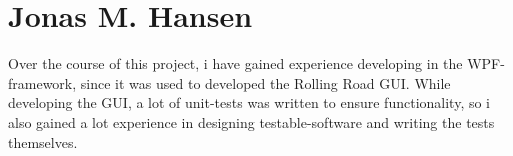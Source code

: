 \section{Jonas M. Hansen}
Over the course of this project, i have gained experience developing in the WPF-framework, since it was used to developed the Rolling Road GUI. While developing the GUI, a lot of unit-tests was written to ensure functionality, so i also gained a lot experience in designing testable-software and writing the tests themselves. 